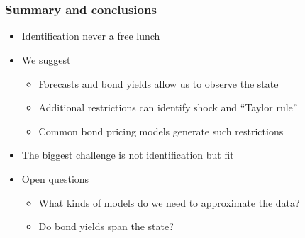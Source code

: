 \documentclass{beamer}
\begin{document}

\section{ }
\begin{frame}
\frametitle{Summary and conclusions}

\begin{itemize} \itemsep=\bigskipamount
\item Identification never a free lunch
\item We suggest \\
\begin{itemize}
\item Forecasts and bond yields allow us to observe the state
\item Additional restrictions can identify shock and ``Taylor rule''
\item Common bond pricing models generate such restrictions
\end{itemize}
\item The biggest challenge is not identification but fit
\item Open questions \\
\begin{itemize}
\item What kinds of models do we need to approximate the data?
\item Do bond yields span the state?
\end{itemize}
\end{itemize}
\end{frame}
\end{document}
